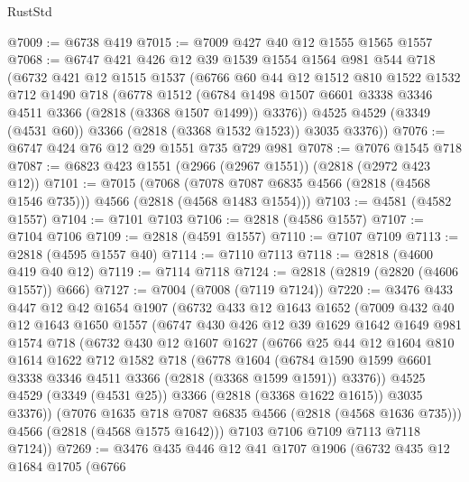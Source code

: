\begin{lexlean}{RustStd}
\begin{coremodule}
@7009 := @6738 @419
@7015 := @7009 @427 @40 @12 @1555 @1565 @1557
@7068 := @6747
    @421
    @426
    @12
    @39
    @1539
    @1554
    @1564
    @981
    @544
    @718
    (@6732
      @421
      @12
      @1515
      @1537
      (@6766
        @60
        @44
        @12
        @1512
        @810
        @1522
        @1532
        @712
        @1490
        @718
        (@6778
          @1512
          (@6784 @1498 @1507 @6601 @3338 @3346 @4511 @3366 (@2818 (@3368 @1507 @1499)) @3376))
        @4525
        @4529
        (@3349 (@4531 @60))
        @3366
        (@2818 (@3368 @1532 @1523))
        @3035
        @3376))
@7076 := @6747 @424 @76 @12 @29 @1551 @735 @729 @981
@7078 := @7076 @1545 @718
@7087 := @6823 @423 @1551 (@2966 (@2967 @1551)) (@2818 (@2972 @423 @12))
@7101 := @7015
    (@7068 (@7078 @7087 @6835 @4566 (@2818 (@4568 @1546 @735))) @4566 (@2818 (@4568 @1483 @1554)))
@7103 := @4581 (@4582 @1557)
@7104 := @7101 @7103
@7106 := @2818 (@4586 @1557)
@7107 := @7104 @7106
@7109 := @2818 (@4591 @1557)
@7110 := @7107 @7109
@7113 := @2818 (@4595 @1557 @40)
@7114 := @7110 @7113
@7118 := @2818 (@4600 @419 @40 @12)
@7119 := @7114 @7118
@7124 := @2818 (@2819 (@2820 (@4606 @1557)) @666)
@7127 := @7004 (@7008 (@7119 @7124))
@7220 := @3476
    @433
    @447
    @12
    @42
    @1654
    @1907
    (@6732
      @433
      @12
      @1643
      @1652
      (@7009
        @432
        @40
        @12
        @1643
        @1650
        @1557
        (@6747
          @430
          @426
          @12
          @39
          @1629
          @1642
          @1649
          @981
          @1574
          @718
          (@6732
            @430
            @12
            @1607
            @1627
            (@6766
              @25
              @44
              @12
              @1604
              @810
              @1614
              @1622
              @712
              @1582
              @718
              (@6778
                @1604
                (@6784 @1590 @1599 @6601 @3338 @3346 @4511 @3366 (@2818 (@3368 @1599 @1591)) @3376))
              @4525
              @4529
              (@3349 (@4531 @25))
              @3366
              (@2818 (@3368 @1622 @1615))
              @3035
              @3376))
          (@7076 @1635 @718 @7087 @6835 @4566 (@2818 (@4568 @1636 @735)))
          @4566
          (@2818 (@4568 @1575 @1642)))
        @7103
        @7106
        @7109
        @7113
        @7118
        @7124))
@7269 := @3476
    @435
    @446
    @12
    @41
    @1707
    @1906
    (@6732
      @435
      @12
      @1684
      @1705
      (@6766

\end{coremodule}
\end{lexlean}
